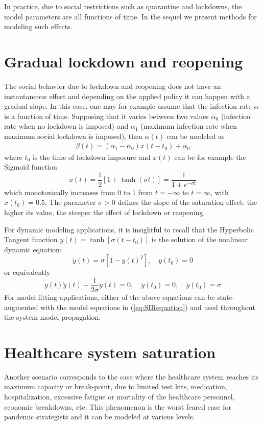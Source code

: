 \documentclass[journal,a4paper,twocolumn]{IEEEtran}
\theoremstyle{definition}
\begin{document}
In practice, due to social restrictions such as quarantine and lockdowns, the model parameters are all functions of time. In the sequel we present methods for modeling such effects.

\section{Gradual lockdown and reopening}
The social behavior due to lockdown and reopening does not have an instantaneous effect and depending on the applied policy it can happen with a gradual slope. In this case, one may for example assume that the infection rate $\alpha$ is a function of time. Supposing that it varies between two values $\alpha_0$ (infection rate when no lockdown is imposed) and $\alpha_1$ (maximum infection rate when maximum social lockdown is imposed), then $\alpha(t)$ can be modeled as
\begin{equation}
    \begin{array}{l}
    \beta(t) = (\alpha_1 - \alpha_0) x(t - t_0) + \alpha_0
    \end{array}
\end{equation}
where $t_0$ is the time of lockdown imposure and $x(t)$ can be for example the Sigmoid function
\begin{equation}
    x(t) = \frac{1}{2}[1 + \tanh{(\sigma t)}] = \frac{1}{1 + e^{-\sigma t}} 
\end{equation}
which monotonically increases from 0 to 1 from $t = -\infty$ to $t = \infty$, with $x(t_0) = 0.5$. The parameter $\sigma > 0$ defines the slope of the saturation effect: the higher its value, the steeper the effect of lockdown or reopening.

For dynamic modeling applications, it is insightful to recall that the Hyperbolic Tangent function $y(t) = \tanh[\sigma (t - t_0)]$ is the solution of the nonlinear dynamic equation:
\begin{equation}
    \dot{y}(t) = \sigma [1 - y(t)^2], \quad y(t_0) = 0
\end{equation}
or equivalently
\begin{equation}
    y(t)\dot{y}(t) +\frac{1}{2\sigma}\ddot{y}(t) = 0, \quad y(t_0) = 0,\quad\dot{y}(t_0) = \sigma
\end{equation}
For model fitting applications, either of the above equations can be state-augmented with the model equations in (\ref{eq:SIRequation}) and used throughout the system model propagation.

\section{Healthcare system saturation}
\label{sec:healthcaresaturation}
Another scenario corresponds to the case where the healthcare system reaches its maximum capacity or break-point, due to limited test kits, medication, hospitalization, excessive fatigue or mortality of the healthcare personnel, economic breakdowns, etc. This phenomenon is the worst feared case for pandemic strategists and it can be modeled at various levels. 
\end{document}

